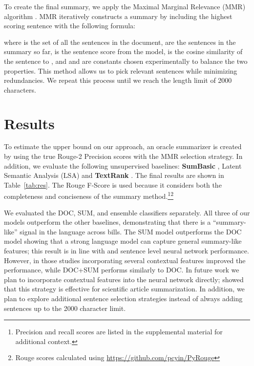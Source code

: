 \documentclass[11pt,a4paper]{article}
\begin{document}
To create the final summary, we apply the Maximal Marginal Relevance (MMR) algorithm \cite{goldstein2000mmr}. MMR iteratively constructs a summary by including the highest scoring sentence with the following formula:



where  is the set of all the sentences in the document,  are the sentences in the summary so far,  is the sentence score from the model,  is the cosine similarity of the sentence to , and  and  are constants chosen experimentally to balance the two properties. This method allows us to pick relevant sentences while minimizing redundancies. We repeat this process until we reach the length limit of 2000 characters.

\section{Results}

To estimate the upper bound on our approach, an oracle summarizer is created by using the true Rouge-2 Precision scores with the MMR selection strategy. In addition, we evaluate the following unsupervised baselines: \textbf{SumBasic} \cite{nenkova2005sumbasic}, Latent Semantic Analysis (LSA) \cite{gong2001lsa} and \textbf{TextRank} \cite{mihalcea2004textrank}.  The final results are shown in Table~\ref{tab:res}. The Rouge F-Score is used because it considers both the completeness and conciseness of the summary method.\footnote{Precision and recall scores are listed in the supplemental material for additional context.}\footnote{Rouge scores calculated using \url{https://github.com/pcyin/PyRouge}}

We evaluated the DOC, SUM, and ensemble classifiers separately. All three of our models outperform the other baselines, demonstrating that there is a ``summary-like'' signal in the language across bills. The SUM model outperforms the DOC model showing that a strong language model can capture general summary-like features; this result is in line with \citet{cao2015learning} and \citet{collins2017supervised} sentence level neural network performance. However, in those studies incorporating several contextual features improved the performance, while DOC+SUM performs similarly to DOC. In future work we plan to incorporate contextual features into the neural network directly; \citet{collins2017supervised} showed that this strategy is effective for scientific article summarization. In addition, we plan to explore additional sentence selection strategies instead of always adding sentences up to the 2000 character limit.
\end{document}
